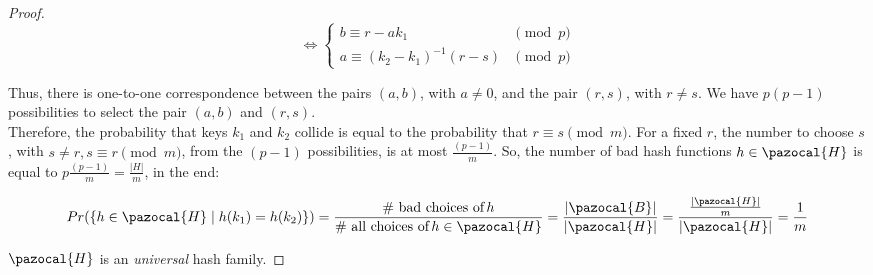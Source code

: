 \documentclass{article}
\newcommand{\Hb}{\pazocal{H}}
\newcommand{\Bb}{\pazocal{B}}
\begin{document}
\begin{proof}
\begin{equation*}
\iff
     \begin{cases}
        b \equiv r - ak_1 & \pmod p \\
        a \equiv (k_2 - k_1)^{-1} (r - s) & \pmod p
    \end{cases}
\end{equation*}



\noindent Thus, there is one-to-one correspondence between the pairs $(a, b)$, with $a \ne 0$, and the pair $(r, s)$, with $r \ne s$. We have $p(p - 1)$ possibilities to select the pair $(a, b)$ and $(r, s)$.\\

\noindent Therefore, the probability that keys $k_1$ and $k_2$ collide is equal to the probability that $r \equiv s \pmod m$. For a fixed $r$, the number to choose $s$, with $s \ne r, s \equiv r \pmod m$, from the $(p - 1)$ possibilities, is at most $\frac{(p - 1)}{m}$. So, the number of bad hash functions $h \in \Hb$ is equal to $p\frac{(p - 1)}{m} = \frac{|H|}{m}$, in the end:

$$
Pr(\{h \in \Hb \mid h(k_1) = h(k_2) \}) = \frac{\text{\# bad choices of} \, h}{\text{\# all choices of} \, h \in \Hb} = \frac{|\Bb|}{|\Hb|} = \frac{\frac{|\Hb|}{m}}{|\Hb|} = \frac{1}{m}
$$ 

\noindent $\Hb$ is an \textit{universal} hash family.

\end{proof}
\end{document}
